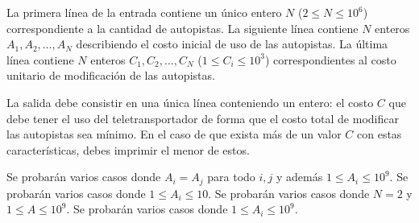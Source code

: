 \documentclass{oci}
\begin{document}
\begin{inputDescription}
  La primera línea de la entrada contiene un único entero $N$ ($2 \leq N \leq
  10^6$) correspondiente a la cantidad de autopistas.
  La siguiente línea contiene $N$ enteros $A_1, A_2, \ldots, A_N$ describiendo el
  costo inicial de uso de las autopistas.
  La última línea contiene $N$ enteros $C_1, C_2, \ldots, C_N$ ($1 \leq C_i \leq
  10^3$) correspondientes al costo unitario de modificación de las autopistas.
\end{inputDescription}

\begin{outputDescription}
  La salida debe consistir en una única línea conteniendo un entero: el costo
  $C$ que debe tener el uso del teletransportador de forma que el costo total de
  modificar las autopistas sea mínimo.
  En el caso de que exista más de un valor $C$ con estas características, debes
  imprimir el menor de estos.
\end{outputDescription}

\begin{scoreDescription}
   Se probarán varios casos donde $A_i=A_j$ para todo $i,j$ y además
  $1 \leq A_i \leq 10^9$.
   Se probarán varios casos donde $1 \leq A_i \leq 10$.
   Se probarán varios casos donde $N=2$ y $1\leq A \leq 10^9$.
   Se probarán varios casos donde $1\leq A_i\leq 10^9$.
\end{scoreDescription}

\begin{sampleDescription}
\end{sampleDescription}
\end{document}
